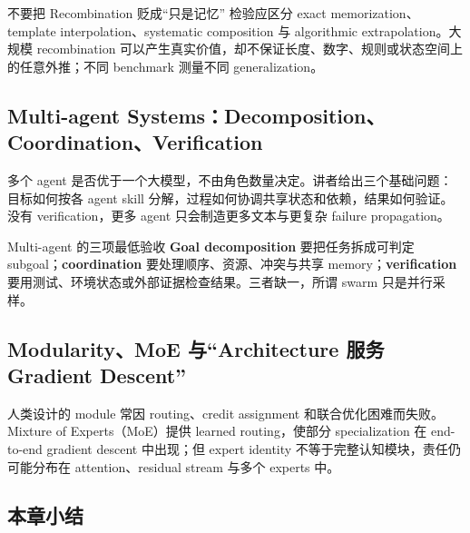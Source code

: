 \documentclass[a4paper]{article}
\begin{document}
\begin{knowledgebox}{不要把 Recombination 贬成“只是记忆”}
检验应区分 exact memorization、template interpolation、systematic composition 与 algorithmic extrapolation。大规模 recombination 可以产生真实价值，却不保证长度、数字、规则或状态空间上的任意外推；不同 benchmark 测量不同 generalization。
\end{knowledgebox}

\subsection{Multi-agent Systems：Decomposition、Coordination、Verification}

多个 agent 是否优于一个大模型，不由角色数量决定。讲者给出三个基础问题：目标如何按各 agent skill 分解，过程如何协调共享状态和依赖，结果如何验证。没有 verification，更多 agent 只会制造更多文本与更复杂 failure propagation。

\begin{importantbox}{Multi-agent 的三项最低验收}
\textbf{Goal decomposition} 要把任务拆成可判定 subgoal；\textbf{coordination} 要处理顺序、资源、冲突与共享 memory；\textbf{verification} 要用测试、环境状态或外部证据检查结果。三者缺一，所谓 swarm 只是并行采样。
\end{importantbox}


\subsection{Modularity、MoE 与“Architecture 服务 Gradient Descent”}

人类设计的 module 常因 routing、credit assignment 和联合优化困难而失败。Mixture of Experts（MoE）提供 learned routing，使部分 specialization 在 end-to-end gradient descent 中出现；但 expert identity 不等于完整认知模块，责任仍可能分布在 attention、residual stream 与多个 experts 中。


\subsection{本章小结}
\end{document}
